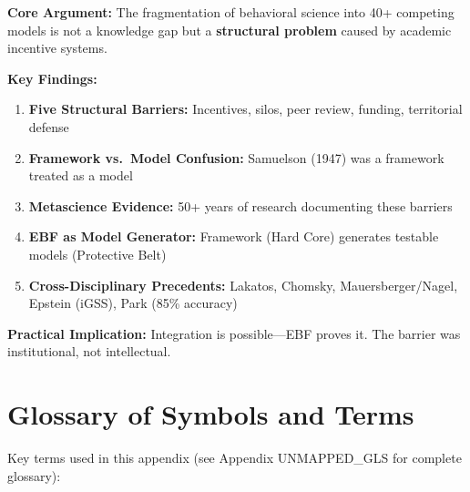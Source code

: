 \begin{tcolorbox}[colback=blue!5!white, colframe=blue!75!black,
    title=\textbf{Chapter Summary}]

\textbf{Core Argument:}
The fragmentation of behavioral science into 40+ competing models is not a knowledge gap
but a \textbf{structural problem} caused by academic incentive systems.

\textbf{Key Findings:}
\begin{enumerate}[nosep]
    \item \textbf{Five Structural Barriers:} Incentives, silos, peer review, funding, territorial defense
    \item \textbf{Framework vs.\ Model Confusion:} Samuelson (1947) was a framework treated as a model
    \item \textbf{Metascience Evidence:} 50+ years of research documenting these barriers
    \item \textbf{EBF as Model Generator:} Framework (Hard Core) generates testable models (Protective Belt)
    \item \textbf{Cross-Disciplinary Precedents:} Lakatos, Chomsky, Mauersberger/Nagel, Epstein (iGSS), Park (85\% accuracy)
\end{enumerate}

\textbf{Practical Implication:}
Integration is possible—EBF proves it. The barrier was institutional, not intellectual.

\end{tcolorbox}


\section{Glossary of Symbols and Terms}
\label{sec:meta-glossary}

Key terms used in this appendix (see Appendix UNMAPPED_GLS for complete glossary):

